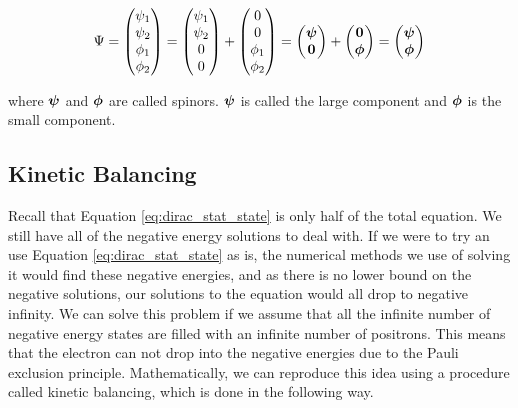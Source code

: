 \begin{equation}
\label{eq:4c_wave}
\Psi =
\begin{pmatrix}
\psi_{1}	\\
\psi_{2}	\\
\phi_{1}	\\
\phi_{2}	\\
\end{pmatrix}
=
\begin{pmatrix}
\psi_{1}	\\
\psi_{2}	\\
0	\\
0	\\
\end{pmatrix}
+
\begin{pmatrix}
0	\\
0	\\
\phi_{1}	\\
\phi_{2}	\\
\end{pmatrix}
=
\begin{pmatrix}
{\bf{\psi}}	\\
\textbf{0}	\\
\end{pmatrix}
+
\begin{pmatrix}
\textbf{0}	\\
{\bf{\phi}}	\\
\end{pmatrix}
=
\begin{pmatrix}
{\bf{\psi}}	\\
{\bf{\phi}}	\\
\end{pmatrix}
\end{equation}

where ${\bf{\psi}}$ and ${\bf{\phi}}$ are called spinors. ${\bf{\psi}}$ is called the large component and ${\bf{\phi}}$ is the small component.

\subsection{Kinetic Balancing}
Recall that Equation \ref{eq:dirac_stat_state} is only half of the total equation. We still have all of the negative energy solutions to deal with. If we were to try an use Equation \ref{eq:dirac_stat_state} as is, the numerical methods we use of solving it would find these negative energies, and as there is no lower bound on the negative solutions, our solutions to the equation would all drop to negative infinity. We can solve this problem if we assume that all the infinite number of negative energy states are filled with an infinite number of positrons. This means that the electron can not drop into the negative energies due to the Pauli exclusion principle. Mathematically, we can reproduce this idea using a procedure called kinetic balancing, which is done in the following way\cite{Piela}.
 
